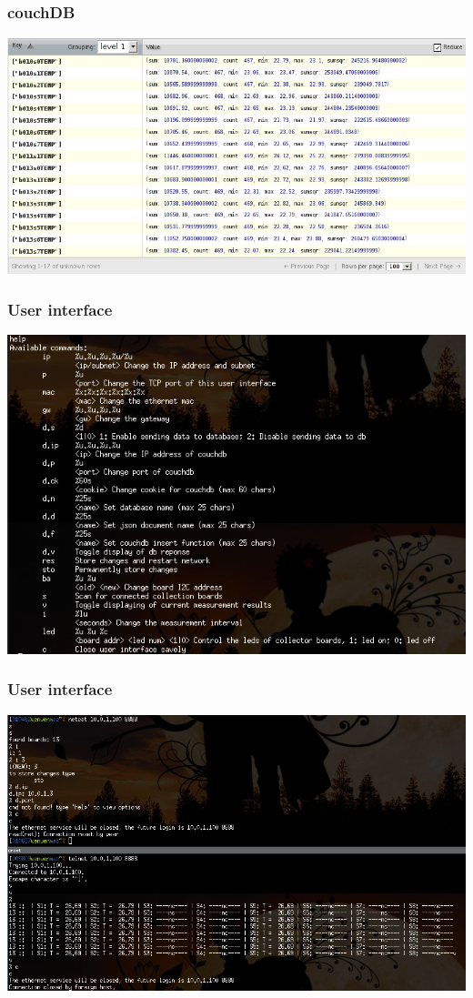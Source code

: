 \documentclass[t]{beamer}
\begin{document}
\begin{frame}[c]
    \frametitle{couchDB}
  \begin{center}
  	\includegraphics[width=0.9\linewidth]{img/db2.png}\\
  \vspace{0.5cm}
  \end{center}
\end{frame}
\begin{frame}[c]
    \frametitle{User interface}
  \begin{center}
  	\includegraphics[width=0.9\linewidth]{img/ui.png}\\
  \vspace{0.5cm}
  \end{center}
\end{frame}
\begin{frame}[c]
    \frametitle{User interface}
  \begin{center}
  	\includegraphics[width=0.9\linewidth]{img/ui2.png}\\
  \vspace{0.5cm}
  \end{center}
\end{frame}
\end{document}
